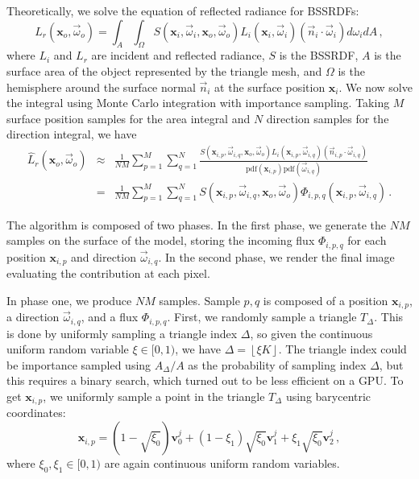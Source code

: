 \documentclass[10pt,a4paper]{article}
\begin{document}
Theoretically, we solve the equation of reflected radiance for BSSRDFs:
\begin{equation*}
L_r(\mathbf{x}_o, \vec{\omega}_o) = \int_A \int_\Omega S(\mathbf{x}_i, \vec{\omega}_i, \mathbf{x}_o, \vec{\omega}_o) L_i(\mathbf{x}_i, \vec{\omega}_i) (\vec{n}_i \cdot \vec{\omega}_i)  d\omega_i d{A} \, ,
\end{equation*}
where $L_i$ and $L_r$ are incident and reflected radiance, $S$ is the BSSRDF, $A$ is the surface area of the object represented by the triangle mesh, and $\Omega$ is the hemisphere around the surface normal $\vec{n}_i$ at the surface position $\mathbf{x}_i$. We now solve the integral using Monte Carlo integration with importance sampling. Taking $M$ surface position samples for the area integral and $N$ direction samples for the direction integral, we have
\begin{eqnarray}
\hat{L}_r(\mathbf{x}_o, \vec{\omega}_o) &\approx& \frac{1}{NM} \sum_{p = 1}^M \sum_{q = 1}^N \frac{S(\mathbf{x}_{i,p}, \vec{\omega}_{i,q}, \mathbf{x}_o, \vec{\omega}_o) L_i(\mathbf{x}_{i,p}, \vec{\omega}_{i,q}) (\vec{n}_{i,p}\cdot \vec{\omega}_{i,q})}{\text{pdf}(\mathbf{x}_{i,p}) \text{pdf}(\vec{\omega}_{i,q})} \nonumber \\
&=& \frac{1}{NM} \sum_{p = 1}^M \sum_{q = 1}^N S(\mathbf{x}_{i,p}, \vec{\omega}_{i,q}, \mathbf{x}_o, \vec{\omega}_o) \Phi_{i,p,q}(\mathbf{x}_{i,p}, \vec{\omega}_{i,q}) \, . \label{eq:mc}
\end{eqnarray}

The algorithm is composed of two phases. In the first phase, we generate the $NM$ samples on the surface of the model, storing the incoming flux $\Phi_{i,p,q}$ for each position $\mathbf{x}_{i,p}$ and direction $\vec{\omega}_{i,q}$. In the second phase, we render the final image evaluating the contribution at each pixel.

In phase one, we produce $NM$ samples. Sample $p,q$ is composed of a position $\mathbf{x}_{i,p}$, a direction $\vec{\omega}_{i,q}$, and a flux $\Phi_{i,p,q}$. First, we randomly sample a triangle $T_\Delta$. This is done by uniformly sampling a triangle index $\Delta$, so given the continuous uniform random variable $\xi \in [0,1)$, we have $\Delta = \left \lfloor{\xi K}\right \rfloor$. The triangle index could be importance sampled using $A_\Delta/A$ as the probability of sampling index $\Delta$, but this requires a binary search, which turned out to be less efficient on a GPU. To get $\mathbf{x}_{i,p}$, we uniformly sample a point in the triangle $T_\Delta$ using barycentric coordinates:
\begin{equation*}
\mathbf{x}_{i,p} = (1 - \sqrt{\xi_0})\mathbf{v}^j_0 + (1 - {\xi_1})  \sqrt{\xi_0} \mathbf{v}^j_1 +  \xi_1\sqrt{\xi_0} \mathbf{v}^j_2 \, ,
\end{equation*}
where $\xi_0, \xi_1 \in [0,1)$ are again continuous uniform random variables.
\end{document}
